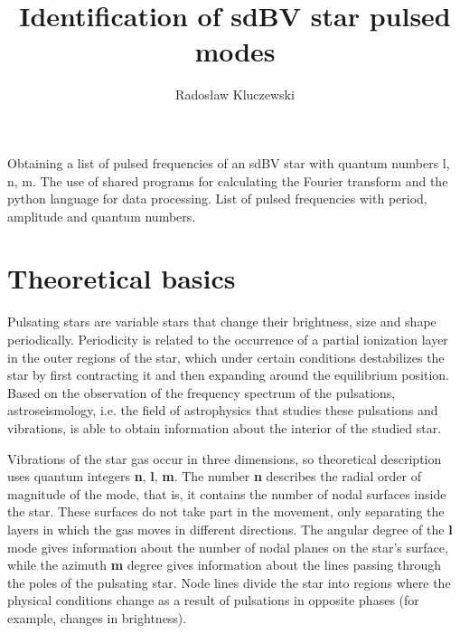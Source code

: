 \documentclass{aa}
\begin{document}
   \title{Identification of sdBV star pulsed modes}
   \subtitle{}
   \author{Radosław Kluczewski }
\abstract
   {} 
 {Obtaining a list of pulsed frequencies of an sdBV star with quantum numbers l, n, m.}
   {The use of shared programs for calculating the Fourier transform and the python language for data processing.}
   {List of pulsed frequencies with period, amplitude and quantum numbers.}
   {}
   \keywords{}
\maketitle
\section{Theoretical basics}

Pulsating stars are variable stars that change their brightness, size and shape periodically. Periodicity is related to the occurrence of a partial ionization layer in the outer regions of the star, which under certain conditions destabilizes the star by first contracting it and then expanding around the equilibrium position. Based on the observation of the frequency spectrum of the pulsations, astroseismology, i.e. the field of astrophysics that studies these pulsations and vibrations, is able to obtain information about the interior of the studied star.

Vibrations of the star gas occur in three dimensions, so theoretical description uses quantum integers \textbf{n}, \textbf{l}, \textbf{m}. The number \textbf{n} describes the radial order of magnitude of the mode, that is, it contains the number of nodal surfaces inside the star. These surfaces do not take part in the movement, only separating the layers in which the gas moves in different directions. The angular degree of the \textbf{l} mode gives information about the number of nodal planes on the star's surface, while the azimuth \textbf{m} degree gives information about the lines passing through the poles of the pulsating star. Node lines divide the star into regions where the physical conditions change as a result of pulsations in opposite phases (for example, changes in brightness).
\end{document}
